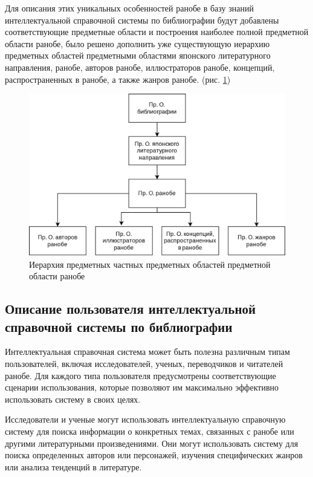 Для описания этих уникальных особенностей ранобе в базу знаний интеллектуальной справочной системы по библиографии будут добавлены соответствующие предметные области и построения наиболее полной предметной области ранобе, было решено дополнить уже существующую иерархию предметных областей предметными областями японского литературного направления, ранобе, авторов ранобе, иллюстраторов ранобе, концепций, распространенных в ранобе, а также жанров ранобе. (рис. \ref{fig:new_structure})
\begin{figure}[H]
    \centering
    \includegraphics[scale=0.2]{imgs/new.drawio.png}
    \caption{Иерархия предметных частных предметных областей предметной области ранобе}
    \label{fig:new_structure}
\end{figure}

\subsection{Описание пользователя интеллектуальной справочной системы по библиографии}

Интеллектуальная справочная система может быть полезна различным типам пользователей, включая исследователей, ученых, переводчиков и читателей ранобе. Для каждого типа пользователя предусмотрены соответствующие сценарии использования, которые позволяют им максимально эффективно использовать систему в своих целях.

Исследователи и ученые могут использовать интеллектуальную справочную систему для поиска информации о конкретных темах, связанных с ранобе или другими литературными произведениями. Они могут использовать систему для поиска определенных авторов или персонажей, изучения специфических жанров или анализа тенденций в литературе.

